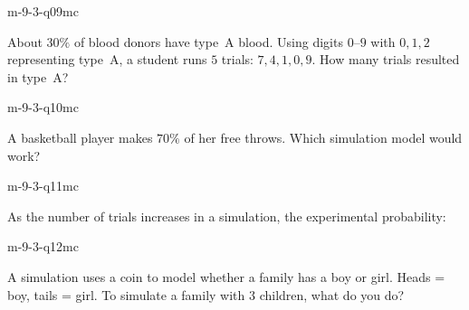 \begin{practiceQuestion}{m-9-3-q09}{mc}
\begin{questionText}
About $30\%$ of blood donors have type~A blood. Using digits $0$--$9$ with $0, 1, 2$ representing type~A, a student runs $5$ trials: $7, 4, 1, 0, 9$. How many trials resulted in type~A?
\end{questionText}
\end{practiceQuestion}

\begin{practiceQuestion}{m-9-3-q10}{mc}
\begin{questionText}
A basketball player makes $70\%$ of her free throws. Which simulation model would work?
\end{questionText}
\end{practiceQuestion}

\begin{practiceQuestion}{m-9-3-q11}{mc}
\begin{questionText}
As the number of trials increases in a simulation, the experimental probability:
\end{questionText}
\end{practiceQuestion}

\begin{practiceQuestion}{m-9-3-q12}{mc}
\begin{questionText}
A simulation uses a coin to model whether a family has a boy or girl. Heads = boy, tails = girl. To simulate a family with $3$ children, what do you do?
\end{questionText}
\end{practiceQuestion}

